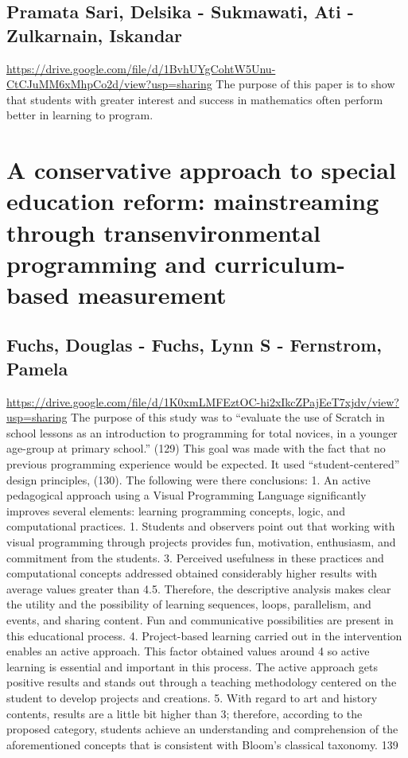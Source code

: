 \documentclass[12pt]{extarticle}
\begin{document}
{\subsection*{Pramata Sari, Delsika - Sukmawati, Ati - Zulkarnain, Iskandar}
\url{https://drive.google.com/file/d/1BvhUYgCohtW5Unu-CtCJuMM6xMhpCo2d/view?usp=sharing}
The purpose of this paper is to show that students with greater interest and success in mathematics often perform better in learning to program.

\section*{A conservative approach to special education reform: mainstreaming through transenvironmental programming and curriculum-based measurement}
\subsection*{Fuchs, Douglas - Fuchs, Lynn S - Fernstrom, Pamela}
\url{https://drive.google.com/file/d/1K0xmLMFEztOC-hi2xIkcZPajEeT7xjdv/view?usp=sharing} 
The purpose of this study was to “evaluate the use of Scratch in school lessons as an introduction to programming for total novices, in a younger age-group at primary school.” (129) This goal was made with the fact that no previous programming experience would be expected. It used “student-centered” design principles, (130). The following were there conclusions: 1. An active pedagogical approach using a Visual Programming Language significantly improves several elements: learning programming concepts, logic, and computational practices. 1. Students and observers point out that working with visual programming through projects provides fun, motivation, enthusiasm, and commitment from the students. 3. Perceived usefulness in these practices and computational concepts addressed obtained considerably higher results with average values greater than 4.5. Therefore, the descriptive analysis makes clear the utility and the possibility of learning sequences, loops, parallelism, and events, and sharing content. Fun and communicative possibilities are present in this educational process. 4. Project-based learning carried out in the intervention enables an active approach. This factor obtained values around 4 so active learning is essential and important in this process. The active approach gets positive results and stands out through a teaching methodology centered on the student to develop projects and creations. 5. With regard to art and history contents, results are a little bit higher than 3; therefore, according to the proposed category, students achieve an understanding and comprehension of the aforementioned concepts that is consistent with Bloom’s classical taxonomy. 139

}
\end{document}
